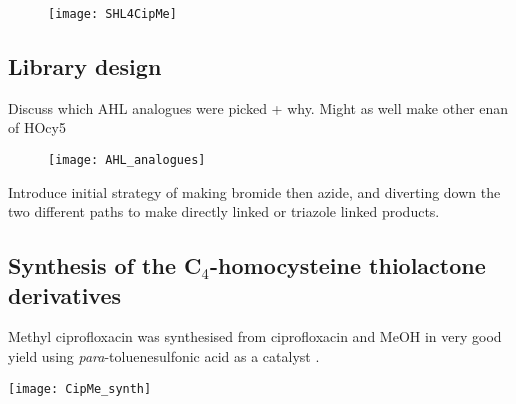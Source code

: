 
\begin{figure}[H]
	\begin{center}
		\texttt{[image: SHL4CipMe]}
		\caption{\label{fig:SHL4CipMe}}
	\end{center}
\end{figure}

\subsection{Library design}

Discuss which AHL analogues were picked + why.
Might as well make other enan of HOcy5

\begin{figure}[H]
	\begin{center}
		\texttt{[image: AHL\_analogues]}
		\caption{\label{fig:HL4_anas}}
	\end{center}
\end{figure}

Introduce initial strategy of making bromide then azide, and diverting down the two different paths to make directly linked or triazole linked products.





\subsection{Synthesis of the C$_4$-homocysteine thiolactone derivatives}

Methyl ciprofloxacin  was synthesised from ciprofloxacin  and MeOH in very good yield using \textit{para}-toluenesulfonic acid as a catalyst \cite{Sachin2010}.

\begin{scheme}[H]
	\begin{center}
		\texttt{[image: CipMe\_synth]}
		\caption{a) \textit{p}-TSA, MeOH, 72 h, reflux, 83.3 \%.\label{sch:CipMe_synth}}
	\end{center}
\end{scheme}

